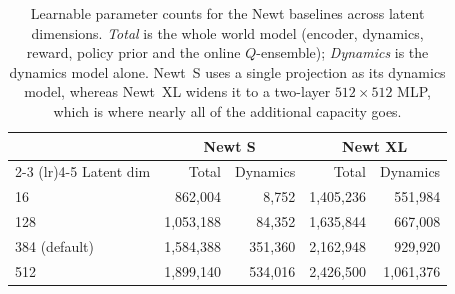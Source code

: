 %
%

\begin{table}[t]
  \centering
  \caption{Learnable parameter counts for the Newt baselines across latent
  dimensions. \emph{Total} is the whole world model (encoder, dynamics, reward,
  policy prior and the online $Q$-ensemble); \emph{Dynamics} is the dynamics
  model alone. Newt~S uses a single projection as its dynamics model, whereas
  Newt~XL widens it to a two-layer $512{\times}512$ MLP, which is where nearly
  all of the additional capacity goes.}
  \label{tab:newt-latent-dim-params}
  \begin{tabular}{lrrrr}
    \toprule
    & \multicolumn{2}{c}{Newt S} & \multicolumn{2}{c}{Newt XL} \\
    \cmidrule(lr){2-3} \cmidrule(lr){4-5}
    Latent dim & Total & Dynamics & Total & Dynamics \\
    \midrule
    16            &   862,004 &   8,752 & 1,405,236 &   551,984 \\
    128           & 1,053,188 &  84,352 & 1,635,844 &   667,008 \\
    384 (default) & 1,584,388 & 351,360 & 2,162,948 &   929,920 \\
    512           & 1,899,140 & 534,016 & 2,426,500 & 1,061,376 \\
    \bottomrule
  \end{tabular}
\end{table}
